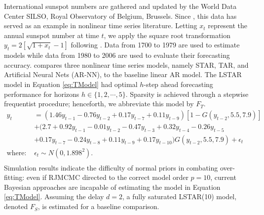 International sunspot numbers are gathered and updated by the World Data Center SILSO, Royal Observatory of Belgium, Brussels. Since \cite{Granger1957} , this data has served as an example in nonlinear time series literature. Letting $x_t$ represent the annual sunspot number at time $t$, we apply the square root transformation $y_t= 2[\sqrt{1+x_t}-1]$ following \cite{Ghaddar1981}. Data from 1700 to 1979 are used to estimate models while data from 1980 to 2006 are used to evaluate their forecasting accuracy. \cite{Terasvirta2010} compares three nonlinear time series models, namely STAR, TAR, and Artificial Neural Nets (AR-NN), to the baseline linear AR model. The LSTAR model in Equation \ref{eq:TModel} had optimal $h$-step ahead forecasting performance for horizons $h \in \{1,2,\cdots,5\}$. Sparsity is achieved through a stepwise frequentist procedure; henceforth, we abbreviate this model by $F_T$. 
\begin{equation}
\begin{split}
 	y_t &=(1.46y_{t-1}-0.76y_{t-2}+0.17y_{t-7}+0.11y_{t-9})[1-G(y_{t-2},5.5,7.9)]\\
 	&+(2.7+0.92y_{t-1}-0.01y_{t-2}-0.47y_{t-3}+0.32y_{t-4}-0.26y_{t-5}\\
 	&+0.17y_{t-7}-0.24y_{t-8}+0.11y_{t-9}+0.17y_{t-10})G(y_{t-2},5.5,7.9)+\hat{\epsilon}_t\\
 	\textrm{where: } & \hat{\epsilon}_t \sim N(0, 1.898^2).\\
\end{split}
\label{eq:TModel}
\end{equation}
Simulation results indicate the difficulty of normal priors in combating over-fitting: even if RJMCMC directed to the correct model order $p=10$, current Bayesian approaches are incapable of estimating the model in Equation \ref{eq:TModel}. Assuming the delay $d=2$, a fully saturated LSTAR(10) model, denoted $F_S$, is estimated for a baseline comparison.

